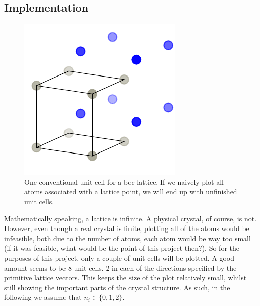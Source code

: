 \documentclass[main.tex]{subfiles}
\begin{document}
	\subsection{Implementation}	
	\begin{figure}
		\begin{center}
			\includegraphics[width=\linewidth]{figures/lattice_unfinished_1.pdf}
		\end{center}
		\caption{One conventional unit cell for a bcc lattice. If we naively plot all atoms associated with a lattice point, we will end up with unfinished unit cells.}
		\label{fig:lattice_unfinished_1}
	\end{figure}
	Mathematically speaking, a lattice is infinite. A physical crystal, of course, is not. However, even though a real crystal is finite, plotting all of the atoms would be infeasible, both due to the number of atoms, each atom would be way too small (if it was feasible, what would be the point of this project then?). So for the purposes of this project, only a couple of unit cells will be plotted. A good amount seems to be 8 unit cells. 2 in each of the directions specified by the primitive lattice vectors. This keeps the size of the plot relatively small, whilst still showing the important parts of the crystal structure. As such, in the following we assume that $ n_i \in \{0, 1, 2\} $.
	
\end{document}
